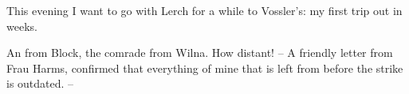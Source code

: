 This evening I want to go with Lerch for a while to Vossler's: my first trip out in weeks.

An  from Block, the comrade from Wilna. How distant! -- A friendly letter from Frau Harms, confirmed that everything of mine that is left from before the strike is outdated. --

